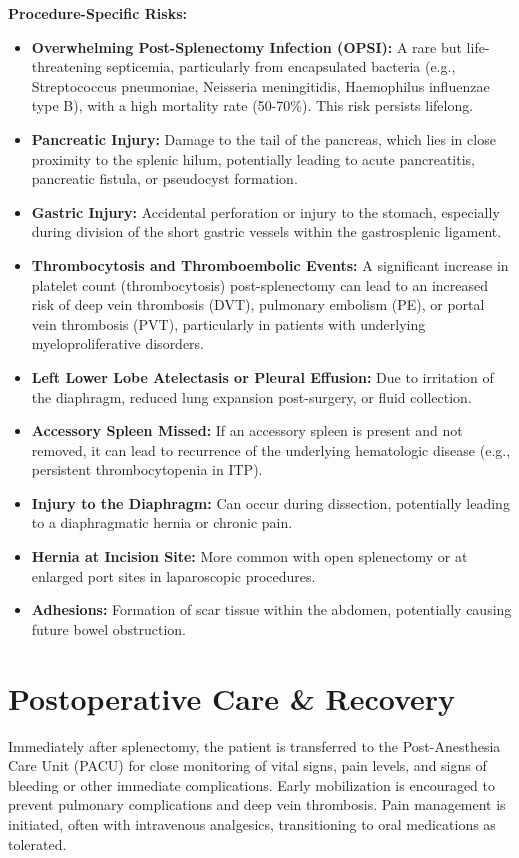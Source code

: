 \textbf{Procedure-Specific Risks:}
\begin{itemize}
  \item \textbf{Overwhelming Post-Splenectomy Infection (OPSI):} A rare but life-threatening septicemia, particularly from encapsulated bacteria (e.g., Streptococcus pneumoniae, Neisseria meningitidis, Haemophilus influenzae type B), with a high mortality rate (50-70\%). This risk persists lifelong.
  \item \textbf{Pancreatic Injury:} Damage to the tail of the pancreas, which lies in close proximity to the splenic hilum, potentially leading to acute pancreatitis, pancreatic fistula, or pseudocyst formation.
  \item \textbf{Gastric Injury:} Accidental perforation or injury to the stomach, especially during division of the short gastric vessels within the gastrosplenic ligament.
  \item \textbf{Thrombocytosis and Thromboembolic Events:} A significant increase in platelet count (thrombocytosis) post-splenectomy can lead to an increased risk of deep vein thrombosis (DVT), pulmonary embolism (PE), or portal vein thrombosis (PVT), particularly in patients with underlying myeloproliferative disorders.
  \item \textbf{Left Lower Lobe Atelectasis or Pleural Effusion:} Due to irritation of the diaphragm, reduced lung expansion post-surgery, or fluid collection.
  \item \textbf{Accessory Spleen Missed:} If an accessory spleen is present and not removed, it can lead to recurrence of the underlying hematologic disease (e.g., persistent thrombocytopenia in ITP).
  \item \textbf{Injury to the Diaphragm:} Can occur during dissection, potentially leading to a diaphragmatic hernia or chronic pain.
  \item \textbf{Hernia at Incision Site:} More common with open splenectomy or at enlarged port sites in laparoscopic procedures.
  \item \textbf{Adhesions:} Formation of scar tissue within the abdomen, potentially causing future bowel obstruction.
\end{itemize}

\section*{Postoperative Care \& Recovery}
Immediately after splenectomy, the patient is transferred to the Post-Anesthesia Care Unit (PACU) for close monitoring of vital signs, pain levels, and signs of bleeding or other immediate complications. Early mobilization is encouraged to prevent pulmonary complications and deep vein thrombosis. Pain management is initiated, often with intravenous analgesics, transitioning to oral medications as tolerated.

